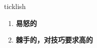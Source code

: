
\begin{frame}
{\huge ticklish}
\begin{center}
\begin{enumerate}\Large
  \item \textbf{易怒的}
  \item \textbf{棘手的，对技巧要求高的}
\end{enumerate}
\end{center}
\end{frame}
